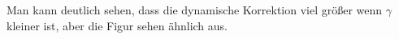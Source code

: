 \documentclass[12pt]{article}
\begin{document}
\begin{figure}[ht]\centering
\end{figure}
\newline
Man kann deutlich sehen, dass die dynamische Korrektion viel größer wenn $\gamma$ kleiner ist, aber die Figur sehen ähnlich aus.
\end{document}
